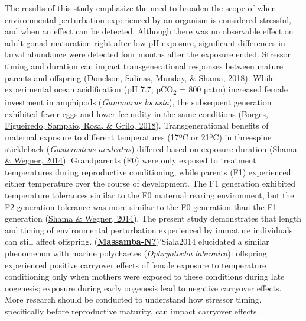 \documentclass [11pt, proquest] {uwthesis}[2015/03/03]
\begin{document}
The results of this study emphasize the need to broaden the scope of when environmental perturbation experienced by an organism is considered stressful, and when an effect can be detected. Although there was no observable effect on adult gonad maturation right after low pH exposure, significant differences in larval abundance were detected four months after the exposure ended. Stressor timing and duration can impact transgenerational responses between mature parents and offspring (\protect\hyperlink{ref-Donelson2018}{Donelson, Salinas, Munday, \& Shama, 2018}). While experimental ocean acidification (pH 7.7; pCO\textsubscript{2} = 800 µatm) increased female investment in amphipods (\emph{Gammarus locusta}), the subsequent generation exhibited fewer eggs and lower fecundity in the same conditions (\protect\hyperlink{ref-Borges2018}{Borges, Figueiredo, Sampaio, Rosa, \& Grilo, 2018}). Transgenerational benefits of maternal exposure to different temperatures (17ºC or 21ºC) in threespine stickleback (\emph{Gasterosteus aculeatus}) differed based on exposure duration (\protect\hyperlink{ref-Shama2014}{Shama \& Wegner, 2014}). Grandparents (F0) were only exposed to treatment temperatures during reproductive conditioning, while parents (F1) experienced either temperature over the course of development. The F1 generation exhibited temperature tolerances similar to the F0 maternal rearing environment, but the F2 generation tolerance was more similar to the F0 generation than the F1 generation (\protect\hyperlink{ref-Shama2014}{Shama \& Wegner, 2014}). The present study demonstrates that length and timing of environmental perturbation experienced by immature individuals can still affect offspring. (\protect\hyperlink{ref-Massamba-N}{\textbf{Massamba-N?}})'Siala2014 elucidated a similar phenomenon with marine polychaetes (\emph{Ophryotocha labronica}): offspring experienced positive carryover effects of female exposure to temperature conditioning only when mothers were exposed to these conditions during late oogenesis; exposure during early oogenesis lead to negative carryover effects. More research should be conducted to understand how stressor timing, specifically before reproductive maturity, can impact carryover effects.
\end{document}
